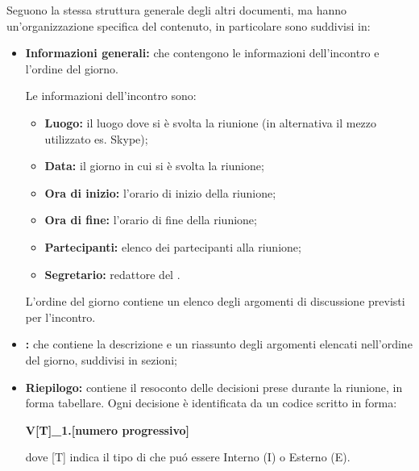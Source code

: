         Seguono la stessa struttura generale degli altri documenti, ma hanno un'organizzazione specifica del contenuto, in particolare sono suddivisi in:
        \begin{itemize}
          \item \textbf{Informazioni generali:} che contengono le informazioni dell'incontro e l'ordine del giorno.
          
             Le informazioni dell'incontro sono:
               \begin{itemize}
                 \item \textbf{Luogo:} il luogo dove si è svolta la riunione (in alternativa il mezzo utilizzato es. Skype);
                 \item \textbf{Data:} il giorno in cui si è svolta la riunione;
                 \item \textbf{Ora di inizio:} l'orario di inizio della riunione;
                 \item \textbf{Ora di fine:} l'orario di fine della riunione;
                 \item \textbf{Partecipanti:} elenco dei partecipanti alla riunione;
                 \item \textbf{Segretario:} redattore del \Verbale{}.
               \end{itemize}
			L'ordine del giorno contiene un elenco degli argomenti di discussione previsti per l'incontro.
          \item \textbf{\Verbale{}}\textbf{:} che contiene la descrizione e un riassunto degli argomenti elencati nell'ordine del giorno, suddivisi in sezioni;
          \item \textbf{Riepilogo:} contiene il resoconto delle decisioni prese durante la riunione, in forma tabellare. Ogni decisione è identificata da un codice scritto in forma:
          \begin{center}
            \textbf{V[T]\_1.[numero progressivo]}
          \end{center}
          dove [T] indica il tipo di \Verbale{} che puó essere Interno (I) o Esterno (E).
        \end{itemize}

